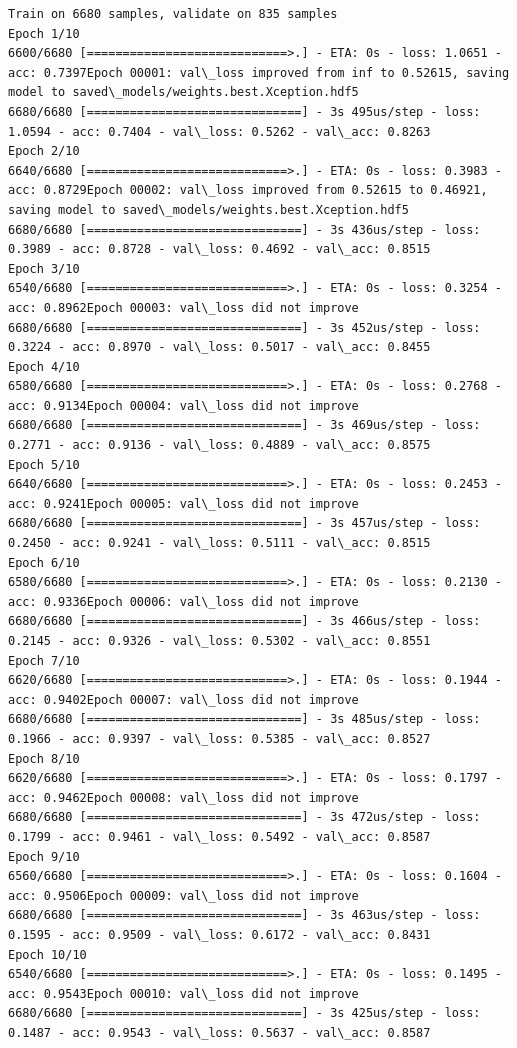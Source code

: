 \documentclass[11pt]{article}
\begin{document}
    \begin{Verbatim}[commandchars=\\\{\}]
Train on 6680 samples, validate on 835 samples
Epoch 1/10
6600/6680 [============================>.] - ETA: 0s - loss: 1.0651 - acc: 0.7397Epoch 00001: val\_loss improved from inf to 0.52615, saving model to saved\_models/weights.best.Xception.hdf5
6680/6680 [==============================] - 3s 495us/step - loss: 1.0594 - acc: 0.7404 - val\_loss: 0.5262 - val\_acc: 0.8263
Epoch 2/10
6640/6680 [============================>.] - ETA: 0s - loss: 0.3983 - acc: 0.8729Epoch 00002: val\_loss improved from 0.52615 to 0.46921, saving model to saved\_models/weights.best.Xception.hdf5
6680/6680 [==============================] - 3s 436us/step - loss: 0.3989 - acc: 0.8728 - val\_loss: 0.4692 - val\_acc: 0.8515
Epoch 3/10
6540/6680 [============================>.] - ETA: 0s - loss: 0.3254 - acc: 0.8962Epoch 00003: val\_loss did not improve
6680/6680 [==============================] - 3s 452us/step - loss: 0.3224 - acc: 0.8970 - val\_loss: 0.5017 - val\_acc: 0.8455
Epoch 4/10
6580/6680 [============================>.] - ETA: 0s - loss: 0.2768 - acc: 0.9134Epoch 00004: val\_loss did not improve
6680/6680 [==============================] - 3s 469us/step - loss: 0.2771 - acc: 0.9136 - val\_loss: 0.4889 - val\_acc: 0.8575
Epoch 5/10
6640/6680 [============================>.] - ETA: 0s - loss: 0.2453 - acc: 0.9241Epoch 00005: val\_loss did not improve
6680/6680 [==============================] - 3s 457us/step - loss: 0.2450 - acc: 0.9241 - val\_loss: 0.5111 - val\_acc: 0.8515
Epoch 6/10
6580/6680 [============================>.] - ETA: 0s - loss: 0.2130 - acc: 0.9336Epoch 00006: val\_loss did not improve
6680/6680 [==============================] - 3s 466us/step - loss: 0.2145 - acc: 0.9326 - val\_loss: 0.5302 - val\_acc: 0.8551
Epoch 7/10
6620/6680 [============================>.] - ETA: 0s - loss: 0.1944 - acc: 0.9402Epoch 00007: val\_loss did not improve
6680/6680 [==============================] - 3s 485us/step - loss: 0.1966 - acc: 0.9397 - val\_loss: 0.5385 - val\_acc: 0.8527
Epoch 8/10
6620/6680 [============================>.] - ETA: 0s - loss: 0.1797 - acc: 0.9462Epoch 00008: val\_loss did not improve
6680/6680 [==============================] - 3s 472us/step - loss: 0.1799 - acc: 0.9461 - val\_loss: 0.5492 - val\_acc: 0.8587
Epoch 9/10
6560/6680 [============================>.] - ETA: 0s - loss: 0.1604 - acc: 0.9506Epoch 00009: val\_loss did not improve
6680/6680 [==============================] - 3s 463us/step - loss: 0.1595 - acc: 0.9509 - val\_loss: 0.6172 - val\_acc: 0.8431
Epoch 10/10
6540/6680 [============================>.] - ETA: 0s - loss: 0.1495 - acc: 0.9543Epoch 00010: val\_loss did not improve
6680/6680 [==============================] - 3s 425us/step - loss: 0.1487 - acc: 0.9543 - val\_loss: 0.5637 - val\_acc: 0.8587

    \end{Verbatim}
\end{document}
